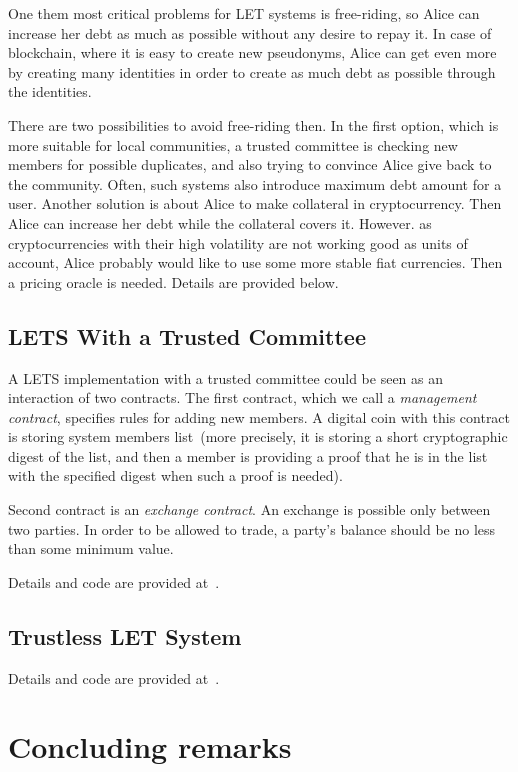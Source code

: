 \documentclass[]{llncs}   %
\begin{document}
One them most critical problems for LET systems is free-riding, so Alice can increase her debt as much as possible without any desire to repay it. In case of blockchain, where it is easy to create new pseudonyms, Alice can get even more by creating many identities in order to create as much debt as possible through the identities.

There are two possibilities to avoid free-riding then. In the first option, which is more suitable for local communities, a trusted committee is checking new members for possible duplicates, and also trying to convince Alice give back to the community. Often, such systems also introduce maximum debt amount for a user. Another solution is about Alice to make collateral in cryptocurrency. Then Alice
can increase her debt while the collateral covers it. However. as cryptocurrencies with their high volatility are not working good as units of account, Alice probably would like to use some more stable fiat currencies. Then a pricing oracle is needed. Details are provided below.

\subsection{LETS With a Trusted Committee}
\label{sec-trusted}

A LETS implementation with a trusted committee could be seen as an interaction of two contracts. The first contract, which we
call a {\em management contract}, specifies rules for adding new members. A digital coin with this contract is storing system members list~(more precisely, it is storing a short cryptographic digest of the list, and then a member is providing a proof that he is in the list with the specified digest when such a proof is needed).

Second contract is an {\em exchange contract}. An exchange is possible only between two parties. In order to be allowed to trade, a party's balance should be no less than some minimum value.

Details and code are provided at~\cite{lets-trusted}.


\subsection{Trustless LET System}
\label{sec-trustless}

Details and code are provided at~\cite{lets-trustless}.


\section{Concluding remarks}
\label{sec-conslusion}
\end{document}
